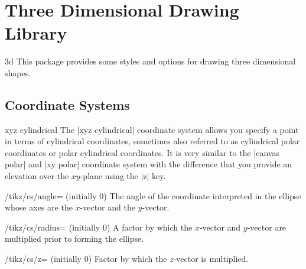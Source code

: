 %
%
%


\section{Three Dimensional Drawing Library}

\begin{tikzlibrary}{3d}
  This package provides some styles and options for drawing three
  dimensional shapes.
\end{tikzlibrary}

\subsection{Coordinate Systems}

\begin{coordinatesystem}{xyz cylindrical}
  The |xyz cylindrical| coordinate system allows you specify a point
  in terms of cylindrical coordinates, sometimes also referred to as
  cylindrical polar coordinates or polar cylindrical coordinates. It
  is very similar to the |canvas polar| and |xy polar| coordinate
  system with the difference that you provide an elevation over the
  $xy$-plane using the |z| key.
  \begin{key}{/tikz/cs/angle= (initially 0)}
    The angle of the coordinate interpreted in the ellipse whose axes
    are the $x$-vector and the $y$-vector.
  \end{key}
  \begin{key}{/tikz/cs/radius= (initially 0)}
    A factor by which the $x$-vector and $y$-vector are multiplied
    prior to forming the ellipse.
  \end{key}
  \begin{key}{/tikz/cs/z= (initially 0)}
    Factor by which the $z$-vector is multiplied.
  \end{key}
\begin{codeexample}[]
\end{codeexample}
\end{coordinatesystem}

